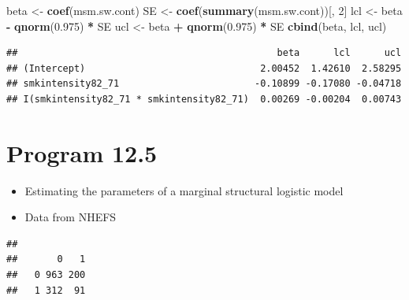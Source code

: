\documentclass[
  10pt,
]{book}
\newenvironment{Shaded}{\begin{snugshade}}{\end{snugshade}}
\newcommand{\DecValTok}[1]{\textcolor[rgb]{0.00,0.00,0.81}{#1}}
\newcommand{\FloatTok}[1]{\textcolor[rgb]{0.00,0.00,0.81}{#1}}
\newcommand{\KeywordTok}[1]{\textcolor[rgb]{0.13,0.29,0.53}{\textbf{#1}}}
\newcommand{\NormalTok}[1]{#1}
\newcommand{\OperatorTok}[1]{\textcolor[rgb]{0.81,0.36,0.00}{\textbf{#1}}}
\newcommand{\StringTok}[1]{\textcolor[rgb]{0.31,0.60,0.02}{#1}}
\providecommand{\tightlist}{%
  \setlength{\itemsep}{0pt}\setlength{\parskip}{0pt}}
\begin{document}
\begin{Shaded}
\begin{Highlighting}[]
\NormalTok{beta \textless{}{-}}\StringTok{ }\KeywordTok{coef}\NormalTok{(msm.sw.cont)}
\NormalTok{SE \textless{}{-}}\StringTok{ }\KeywordTok{coef}\NormalTok{(}\KeywordTok{summary}\NormalTok{(msm.sw.cont))[, }\DecValTok{2}\NormalTok{]}
\NormalTok{lcl \textless{}{-}}\StringTok{ }\NormalTok{beta }\OperatorTok{{-}}\StringTok{ }\KeywordTok{qnorm}\NormalTok{(}\FloatTok{0.975}\NormalTok{) }\OperatorTok{*}\StringTok{ }\NormalTok{SE}
\NormalTok{ucl \textless{}{-}}\StringTok{ }\NormalTok{beta }\OperatorTok{+}\StringTok{ }\KeywordTok{qnorm}\NormalTok{(}\FloatTok{0.975}\NormalTok{) }\OperatorTok{*}\StringTok{ }\NormalTok{SE}
\KeywordTok{cbind}\NormalTok{(beta, lcl, ucl)}
\end{Highlighting}
\end{Shaded}

\begin{verbatim}
##                                              beta      lcl      ucl
## (Intercept)                               2.00452  1.42610  2.58295
## smkintensity82_71                        -0.10899 -0.17080 -0.04718
## I(smkintensity82_71 * smkintensity82_71)  0.00269 -0.00204  0.00743
\end{verbatim}

\hypertarget{program-12.5}{%
\section{Program 12.5}\label{program-12.5}}

\begin{itemize}
\tightlist
\item
  Estimating the parameters of a marginal structural logistic model
\item
  Data from NHEFS
\end{itemize}

\begin{Shaded}
\end{Shaded}

\begin{verbatim}
##    
##       0   1
##   0 963 200
##   1 312  91
\end{verbatim}
\end{document}
